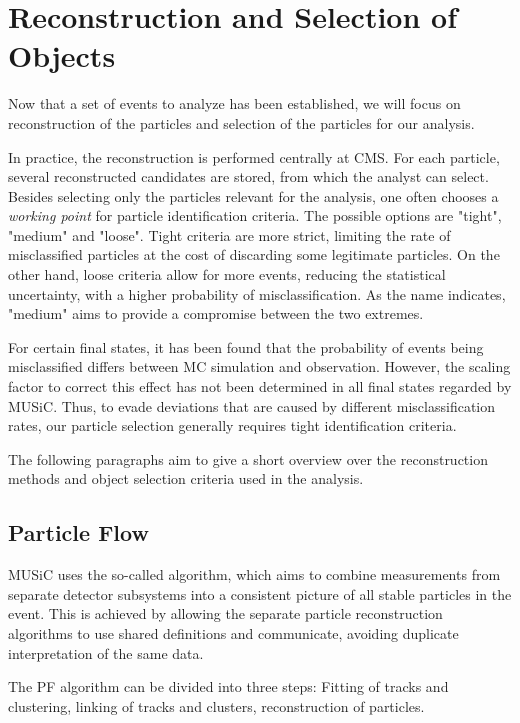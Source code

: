 \section{Reconstruction and Selection of Objects}
\label{sec:reconstruction}

Now that a set of events to analyze has been established, we will focus on reconstruction of the particles and selection of the particles for our analysis. 

In practice, the reconstruction is performed centrally at \ac{CMS}. For each particle, several reconstructed candidates are stored, from which the analyst can select. 
Besides selecting only the particles relevant for the analysis, one often chooses a \emph{working point} for particle identification criteria. The possible options are "tight", "medium" and "loose". Tight criteria are more strict, limiting the rate of misclassified particles at the cost of discarding some legitimate particles. On the other hand, loose criteria allow for more events, reducing the statistical uncertainty, with a higher probability of misclassification. As the name indicates, "medium" aims to provide a compromise between the two extremes.

For certain final states, it has been found that the probability of events being misclassified differs between \ac{MC} simulation and observation. However, the scaling factor to correct this effect has not been determined in all final states regarded by \ac{MUSiC}. Thus, to evade deviations that are caused by different misclassification rates, our particle selection generally requires tight identification criteria.

The following paragraphs aim to give a short overview over the reconstruction methods and object selection criteria used in the analysis. 

\subsection{Particle Flow}
\ac{MUSiC} uses the so-called  algorithm\cite{CMS:CMS-PAS-PFT-09-001}, which aims to combine measurements from separate detector subsystems into a consistent picture of all stable particles in the event. This is achieved by allowing the separate particle reconstruction algorithms to use shared definitions and communicate, avoiding duplicate interpretation of the same data.

The \ac{PF} algorithm can be divided into three steps: Fitting of tracks and clustering, linking of tracks and clusters, reconstruction of particles.


